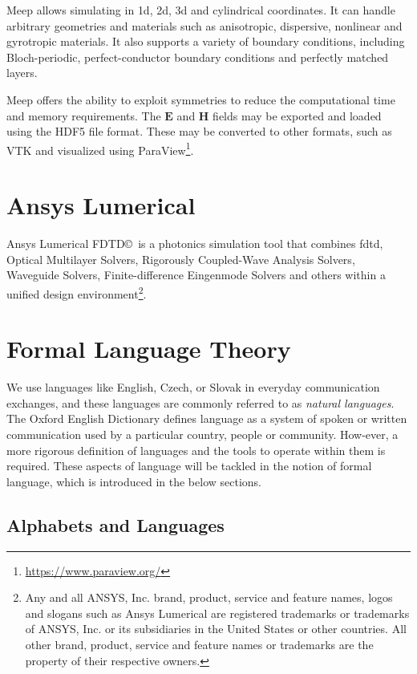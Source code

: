 Meep allows simulating in \gls{1d}, \gls{2d}, \gls{3d} and cylindrical coordinates. It can handle arbitrary geometries and materials such as anisotropic, dispersive, nonlinear and gyrotropic materials. It also supports a variety of boundary conditions, including Bloch-periodic, perfect-conductor boundary conditions and perfectly matched layers. 

Meep offers the ability to exploit symmetries to reduce the computational time and memory requirements. The $\mathbf{E}$ and $\mathbf{H}$ fields may be exported and loaded using the HDF5 file format. These may be converted to other formats, such as VTK and visualized using ParaView\footnote{\url{https://www.paraview.org/}}. 

\section{Ansys Lumerical}\label{sec:lumerical}
Ansys Lumerical FDTD\copyright \ is a photonics simulation tool that combines \gls{fdtd}, Optical Multilayer Solvers, Rigorously Coupled-Wave Analysis Solvers, Waveguide Solvers, Finite-difference Eingenmode Solvers and others within a unified design environment\footnote{Any and all ANSYS, Inc. brand, product, service and feature names, logos and slogans such as Ansys Lumerical are registered trademarks or trademarks of ANSYS, Inc. or its subsidiaries in the United States or other countries. All other brand, product, service and feature names or trademarks are the property of their respective owners.}.


\section{Formal Language Theory}\label{sec:formal-language-theory}
We use languages like English, Czech, or Slovak in everyday communication exchanges, and these languages are commonly referred to as \emph{natural languages}. The Oxford English Dictionary defines language as a system of spoken or written communication used by a particular country, people or community. How-ever, a more rigorous definition of languages and the tools to operate within them is required. These aspects of language will be tackled in the notion of formal language, which is introduced in the below sections.

\subsection{Alphabets and Languages}

